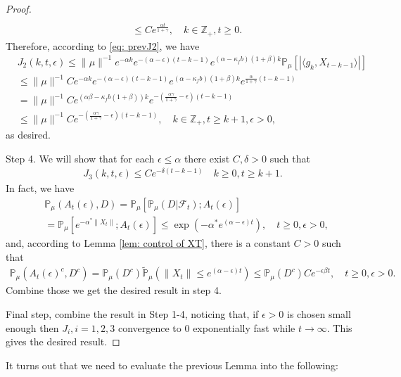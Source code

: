 \documentclass[12pt]{amsart}
\theoremstyle{plain}
\theoremstyle{definition}
\numberwithin{equation}{section}
\begin{document}
\begin{proof}
\begin{align}
    \\&\leq C e^{\frac{\alpha t}{1+\gamma}},\quad k \in \mathbb Z_+, t\geq 0.
\end{align}
Therefore, according to \eqref{eq: prevJ2}, we have
\begin{align}
	&J_2(k,t,\epsilon)
	\leq  \|\mu\|^{-1}e^{-\alpha k}e^{-(\alpha-\epsilon)(t-k-1)}e^{(\alpha-\kappa_f b)(1+\beta)k} \mathbb{P}_{\mu}\left[\left|\langle g_k,X_{t-k-1}\rangle\right|\right]
	\\&\leq \|\mu\|^{-1}C e^{-\alpha k}e^{-(\alpha-\epsilon)(t-k-1)}e^{(\alpha-\kappa_f b)(1+\beta)k} e^{\frac{\alpha}{1+\gamma}(t-k-1)}
	\\&= \|\mu\|^{-1}C e^{(\alpha \beta - \kappa_f b(1+\beta))k}e^{-(\frac{\alpha\gamma}{1+\gamma}-\epsilon)(t-k-1)}
	\\&\leq \|\mu\|^{-1}C e^{-(\frac{\alpha\gamma}{1+\gamma}-\epsilon)(t-k-1)}, \quad k \in \mathbb Z_+, t\geq k+1, \epsilon > 0,
\end{align}
	as desired.

	Step 4. We will show that for each $\epsilon\leq \alpha$ there exist $C,\delta>0$ such that
\begin{align}\label{ineq: control of J3}
    J_3(k,t,\epsilon)\leq Ce^{-\delta (t-k-1)}\quad k\geq0, t\geq k+1.
\end{align}
	In fact, we have
\begin{align}
	&\mathbb P_{\mu}(A_{t}(\epsilon), D) = \mathbb P_{\mu}[\mathbb P_{\mu}(D|\mathscr F_t);A_t(\epsilon)]
	\\&= \mathbb P_\mu[e^{-\alpha^*\|X_t\|};A_t(\epsilon)]
	\leq \exp({-\alpha^* e^{(\alpha - \epsilon)t}}),\quad t\geq 0, \epsilon >0,
\end{align}
	and, according to Lemma \ref{lem: control of XT}, there is a constant $C>0$ such that
\begin{align}
	\mathbb P_\mu(A_t(\epsilon)^c,D^c) = \mathbb P_\mu(D^c) \tilde{\mathbb P}_\mu(\|X_t\|\leq e^{(\alpha - \epsilon) t}) \leq \mathbb P_\mu(D^c)C e^{-\epsilon \beta t},\quad t\geq 0, \epsilon >0.
\end{align}
	Combine those we get the desired result in step 4.

	Final step, combine the result in Step 1-4, noticing that, if $\epsilon>0$ is chosen small enough then $J_{i}, i = 1,2,3$ convergence to $0$ exponentially fast while $t\rightarrow\infty$.
	This gives the desired result.
\end{proof}

	It turns out that we need to evaluate the previous Lemma into the following:
\end{document}
